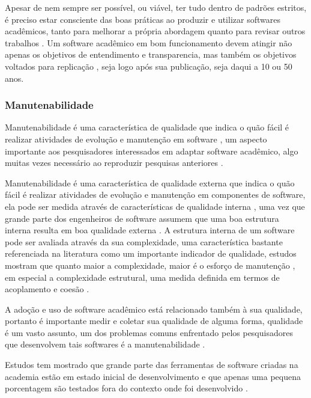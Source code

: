 Apesar de nem sempre ser possível, ou viável, ter tudo dentro de padrões
estritos, é preciso estar consciente das boas práticas ao produzir e utilizar
softwares acadêmicos, tanto para melhorar a própria abordagem quanto para
revisar outros trabalhos \cite{wilson2014best}. Um software acadêmico em bom
funcionamento devem atingir não apenas os objetivos de entendimento e
transparencia, mas também os objetivos voltados para replicação
\cite{Stodden2010}, seja logo após sua publicação, seja daqui a 10 ou 50 anos.

\subsubsection{Manutenabilidade}


Manutenabilidade é uma característica de qualidade que indica o quão fácil é
realizar atividades de evolução e manutenção em software
\cite{kumar2012survey}, um aspecto importante aos pesquisadores interessados em
adaptar software acadêmico, algo muitas vezes necessário ao reproduzir
pesquisas anteriores \cite{Peng2011}.

Manutenabilidade é uma característica de qualidade externa que indica o quão
fácil é realizar atividades de evolução e manutenção em componentes de
software, ela pode ser medida através de características de qualidade interna
\cite{hashim1996software, Dagpinar2003}, uma vez que grande parte dos
engenheiros de software assumem que uma boa estrutura interna resulta em boa
qualidade externa \cite{Fenton2014}.
A estrutura interna de um software pode ser avaliada através da sua
complexidade, uma característica bastante referenciada na literatura como um
importante indicador de qualidade, estudos mostram que quanto maior a
complexidade, maior é o esforço de manutenção \cite{hashim1996software,
Darcy2005}, em especial a complexidade estrutural, uma medida definida em
termos de acoplamento e coesão \cite{Terceiro2012}.

A adoção e uso de software acadêmico está relacionado também à sua qualidade,
portanto é importante medir e coletar sua qualidade de alguma forma, qualidade
é um vasto assunto, um dos problemas comuns enfrentado pelos pesquisadores que
desenvolvem tais softwares é a manutenabilidade \cite{Prlic2012}.

Estudos tem mostrado que grande parte das ferramentas de software criadas na
academia estão em estado inicial de desenvolvimento \cite{marshall2013tools} e
que apenas uma pequena porcentagem são testados fora do contexto onde foi
desenvolvido \cite{Portillo12}.


